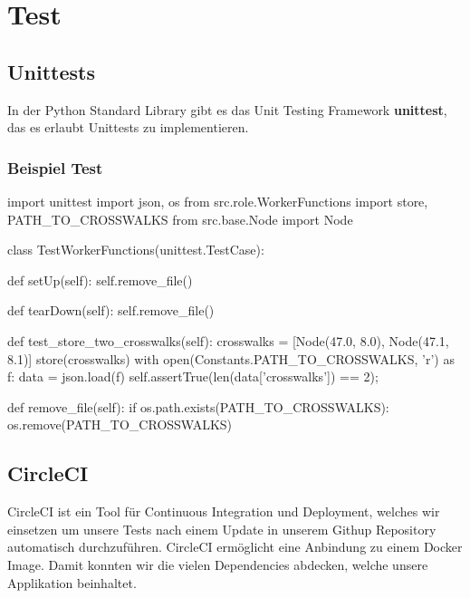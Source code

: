 \section{Test}
\subsection{Unittests}
In der Python Standard Library gibt es das Unit Testing Framework \textbf{unittest}, das es erlaubt Unittests zu implementieren.

\subsubsection{Beispiel Test}
\begin{python}
import unittest
import json, os
from src.role.WorkerFunctions import store, PATH_TO_CROSSWALKS
from src.base.Node import Node

class TestWorkerFunctions(unittest.TestCase):

    def setUp(self):
        self.remove_file()

    def tearDown(self):
        self.remove_file()
        
    def test_store_two_crosswalks(self):
        crosswalks = [Node(47.0, 8.0), Node(47.1, 8.1)]
        store(crosswalks)
        with open(Constants.PATH_TO_CROSSWALKS, 'r') as f:
            data = json.load(f)
        self.assertTrue(len(data['crosswalks']) == 2);
        
    def remove_file(self):
        if os.path.exists(PATH_TO_CROSSWALKS):
            os.remove(PATH_TO_CROSSWALKS) 
\end{python}
\subsection{CircleCI}
\Gls{CircleCI}\cite{circleci} ist ein Tool für Continuous Integration und Deployment, welches wir einsetzen um unsere Tests nach einem Update in unserem Githup Repository automatisch durchzuführen. CircleCI ermöglicht eine Anbindung zu einem Docker Image. Damit konnten wir die vielen Dependencies abdecken, welche unsere Applikation beinhaltet.
